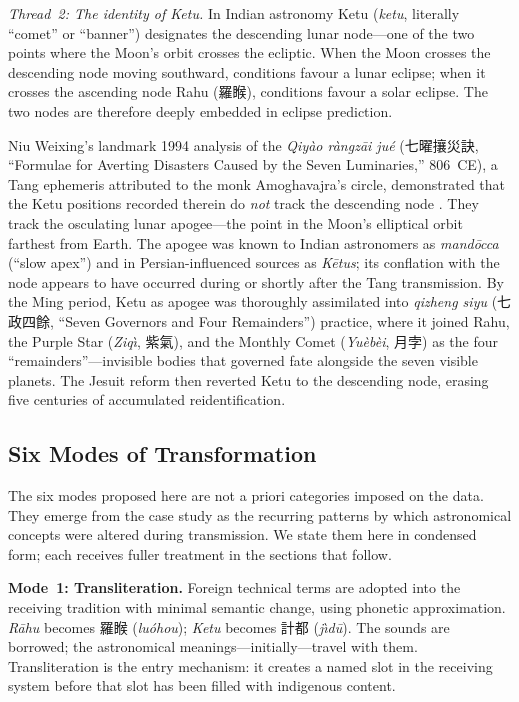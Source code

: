 \documentclass[10pt,a4paper]{article}
\newcommand{\zh}[1]{#1}
\begin{document}
\textit{Thread~2: The identity of Ketu.}  In Indian astronomy Ketu (\textit{ketu},
literally ``comet'' or ``banner'') designates the descending lunar node---one of
the two points where the Moon's orbit crosses the ecliptic.  When the Moon crosses
the descending node moving southward, conditions favour a lunar eclipse; when
it crosses the ascending node Rahu (\zh{羅睺}), conditions favour a solar eclipse.
The two nodes are therefore deeply embedded in eclipse prediction.

Niu Weixing's landmark 1994 analysis of the \textit{Qiy\`ao r\`angz\=ai ju\'e} (\zh{七曜攘災訣}, ``Formulae for Averting Disasters Caused by the Seven Luminaries,'' 806~CE), a Tang
ephemeris attributed to the monk Amoghavajra's circle, demonstrated that the
Ketu positions recorded therein do \emph{not} track the descending node
\cite{niu1995ketu}.  They track the osculating lunar apogee---the point in the
Moon's elliptical orbit farthest from Earth.  The apogee was known to Indian
astronomers as \textit{mand\=occa} (``slow apex'') and in Persian-influenced
sources as \textit{K\=etus}; its conflation with the node appears to have
occurred during or shortly after the Tang transmission.  By the Ming period,
Ketu as apogee was thoroughly assimilated into \textit{qizheng siyu} (\zh{七政四餘}, ``Seven Governors and Four Remainders'') practice, where it
joined Rahu, the Purple Star (\textit{Ziq\`{\i}}, \zh{紫氣}), and the Monthly Comet
(\textit{Yu\`{e}b\`{e}i}, \zh{月孛}) as the four ``remainders''---invisible bodies that governed fate
alongside the seven visible planets.  The Jesuit reform then reverted Ketu to
the descending node, erasing five centuries of accumulated reidentification.

\subsection*{Six Modes of Transformation}

The six modes proposed here are not a priori categories imposed on the data.
They emerge from the case study as the recurring patterns by which astronomical
concepts were altered during transmission.  We state them here in condensed form;
each receives fuller treatment in the sections that follow.

\textbf{Mode~1: Transliteration.}  Foreign technical terms are adopted into the
receiving tradition with minimal semantic change, using phonetic approximation.
\textit{R\=ahu} becomes \zh{羅睺} (\textit{lu\'ohou}); \textit{Ketu} becomes
\zh{計都} (\textit{j\`{\i}d\=u}).  The sounds are borrowed; the astronomical
meanings---initially---travel with them.  Transliteration is the entry mechanism:
it creates a named slot in the receiving system before that slot has been filled
with indigenous content.
\end{document}
